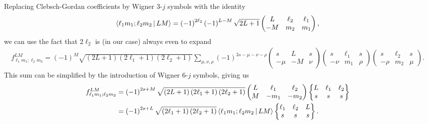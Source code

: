 \documentclass[notitlepage,twocolumn]{revtex4-2}
\newcommand{\p}[1]{\left(#1\right)} %
\newcommand{\bk}{\Braket} %
\begin{document}
Replacing Clebsch-Gordan coefficients by Wigner 3-$j$ symbols with the identity
\begin{align}
  \bk{\ell_1 m_1; \ell_2 m_2| L M}
  = \p{-1}^{2\ell_2} \p{-1}^{L-M} \sqrt{2L+1}
  \begin{pmatrix}
    L & \ell_2 & \ell_1 \\
    -M & m_2 & m_1
  \end{pmatrix},
\end{align}
we can use the fact that $2\ell_2$ is (in our case) always even to expand
\begin{align}
  f_{\ell_1 m_1;\ell_2 m_2}^{LM}
  = \p{-1}^M \sqrt{\p{2L+1}\p{2\ell_1+1}\p{2\ell_2+1}}
  \sum_{\mu,\nu,\rho} \p{-1}^{3s-\mu-\nu-\rho}
  \begin{pmatrix}
    s & L & s \\
    -\mu & -M & \nu
  \end{pmatrix}
  \begin{pmatrix}
    s & \ell_1 & s \\
    -\nu & m_1 & \rho
  \end{pmatrix}
  \begin{pmatrix}
    s & \ell_2 & s \\
    -\rho & m_2 & \mu
  \end{pmatrix}.
\end{align}
This sum can be simplified by the introduction of Wigner 6-$j$ symbols, giving us
\begin{align}
  f_{\ell_1 m_1;\ell_2 m_2}^{LM}
  &= \p{-1}^{2s+M} \sqrt{\p{2L+1}\p{2\ell_1+1}\p{2\ell_2+1}}
  \begin{pmatrix}
    L & \ell_1 & \ell_2 \\
    M & -m_1 & -m_2
  \end{pmatrix}
  \begin{Bmatrix}
    L & \ell_1 & \ell_2 \\
    s & s & s
  \end{Bmatrix} \\
  &= \p{-1}^{2s+L} \sqrt{\p{2\ell_1+1}\p{2\ell_2+1}}
  \bk{\ell_1 m_1; \ell_2 m_2| LM}
  \begin{Bmatrix}
    \ell_1 & \ell_2 & L \\
    s & s & s
  \end{Bmatrix}.
\end{align}
\end{document}
